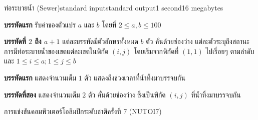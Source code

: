 \documentclass[11pt,a4paper]{article}
\begin{document}
\begin{problem}{ท่อระบายน้ำ (Sewer)}{standard input}{standard output}{1 second}{16 megabytes}
\InputFile

\textbf{บรรทัดแรก} รับค่าของตัวแปร $a$ และ $b$ โดยที่ $2 \leq a,b \leq 100$
\newpage

\textbf{บรรทัดที่ $2$ ถึง $a + 1$} แต่ละบรรทัดมีตัวอักษรทั้งหมด $b$ ตัว คั่นด้วยช่องว่าง แต่ละตัวระบุถึงสถานะการมีท่อระบายน้ำของเขตแต่ละเขตในพิกัด $(i, j)$ โดยเริ่มจากพิกัดที่ $(1, 1)$ ไปเรื่อยๆ ตามลำดับ และ $1 \leq i \leq a; 1 \leq j \leq b$


\OutputFile

\textbf{บรรทัดแรก} แสดงจำนวนเต็ม $1$ ตัว แสดงถึงช่วงเวลาที่น้ำทิ้งมาบรรจบกัน

\textbf{บรรทัดที่สอง} แสดงจำนวนเต็ม $2$ ตัว คั่นด้วยช่องว่าง ซึ่งเป็นพิกัด $(i, j)$ ที่น้ำทิ้งมาบรรจบกัน

\Examples

\begin{example}
%
%
\end{example}


\Source

การแข่งขันคอมพิวเตอร์โอลิมปิกระดับชาติครั้งที่ 7 (NUTOI7)

\end{problem}
\end{document}
